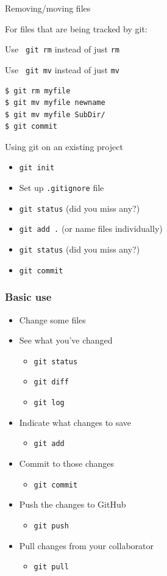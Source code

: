 \documentclass[12pt,t]{beamer}
\newcommand{\bi}{\begin{itemize}}
\newcommand{\bbi}{\vspace{24pt} \begin{itemize} \itemsep8pt}
\newcommand{\ei}{\end{itemize}}
\begin{document}
\begin{frame}[fragile]{Removing/moving files}

\vspace{24pt}

For files that are being tracked by git:

\bigskip

\hspace{1em} Use {\tt \color{hilit} git rm} instead of just {\tt rm}

\hspace{1em} Use {\tt \color{hilit} git mv} instead of just {\tt mv}

\begin{lstlisting}
$ git rm myfile
$ git mv myfile newname
$ git mv myfile SubDir/
$ git commit
\end{lstlisting}

\note{
}
\end{frame}



\begin{frame}{Using git on an existing project}

\bbi
\item {\tt git init}
\item Set up {\tt .gitignore} file
\item {\tt git status} {\footnotesize \color{lolit} (did you miss any?)}
\item {\tt git add .} {\footnotesize \color{lolit} (or name files individually)}
\item {\tt git status} {\footnotesize \color{lolit} (did you miss any?)}
\item {\tt git commit}
\ei


\note{
}
\end{frame}


\begin{frame}
\frametitle{Basic use}

\bbi
\item Change some files
\item See what you've changed
\bi
\item[] {\tt git status}
\item[] {\tt git diff}
\item[] {\tt git log}
\ei
\item Indicate what changes to save
\bi
\item[] {\tt git add}
\ei
\item Commit to those changes
\bi
\item[] {\tt git commit}
\ei
\item Push the changes to GitHub
\bi
\item[] {\tt git push}
\ei
\item Pull changes from your collaborator
\bi
\item[] {\tt git pull}
\ei
\ei

\note{
}
\end{frame}
\end{document}

